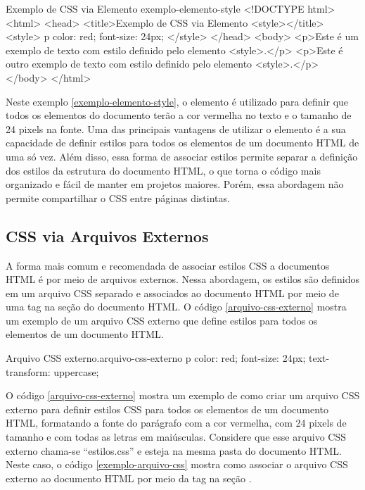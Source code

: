 \begin{htmlcode}{Exemplo de CSS via Elemento }{exemplo-elemento-style}
<!DOCTYPE html>
<html>
<head>
    <title>Exemplo de CSS via Elemento <style></title>
    <style>
        p {
            color: red;
            font-size: 24px;
        }
    </style>
</head>
<body>
    <p>Este é um exemplo de texto com estilo definido pelo elemento <style>.</p>
    <p>Este é outro exemplo de texto com estilo definido pelo elemento <style>.</p>
</body>
</html>
\end{htmlcode}

Neste exemplo \ref{exemplo-elemento-style}, o elemento  é utilizado para definir que todos os elementos  do documento terão a cor vermelha no texto e o tamanho de 24 pixels na fonte. Uma das principais vantagens de utilizar o elemento  é a sua capacidade de definir estilos para todos os elementos de um documento HTML de uma só vez. Além disso, essa forma de associar estilos permite separar a definição dos estilos da estrutura do documento HTML, o que torna o código mais organizado e fácil de manter em projetos maiores. Porém, essa abordagem não permite compartilhar o CSS entre páginas distintas.

\subsection{CSS via Arquivos Externos}

A forma mais comum e recomendada de associar estilos CSS a documentos HTML é por meio de arquivos externos. Nessa abordagem, os estilos são definidos em um arquivo CSS separado e associados ao documento HTML por meio de uma tag  na seção  do documento HTML. O código \ref{arquivo-css-externo} mostra um exemplo de um arquivo CSS externo que define estilos para todos os elementos  de um documento HTML.

\vspace{5pt}
\begin{csscode}{Arquivo CSS externo.}{arquivo-css-externo}
p {
    color: red;
    font-size: 24px;
    text-transform: uppercase;
}
\end{csscode}

O código \ref{arquivo-css-externo} mostra um exemplo de como criar um arquivo CSS externo para definir estilos CSS para todos os elementos  de um documento HTML, formatando a fonte do parágrafo com a cor vermelha, com 24 pixels de tamanho e com todas as letras em maiúsculas. Considere que esse arquivo CSS externo chama-se ``estilos.css'' e esteja na mesma pasta do documento HTML. Neste caso, o código \ref{exemplo-arquivo-css} mostra como associar o arquivo CSS externo ao documento HTML por meio da tag  na seção .

